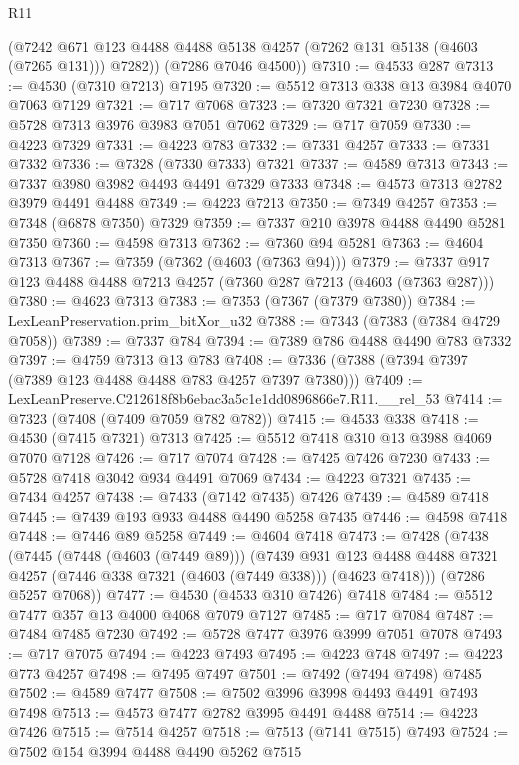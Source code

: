 \begin{lexlean}{R11}
\begin{coremodule}
        (@7242 @671 @123 @4488 @4488 @5138 @4257 (@7262 @131 @5138 (@4603 (@7265 @131))) @7282))
      (@7286 @7046 @4500))
@7310 := @4533 @287
@7313 := @4530 (@7310 @7213) @7195
@7320 := @5512 @7313 @338 @13 @3984 @4070 @7063 @7129
@7321 := @717 @7068
@7323 := @7320 @7321 @7230
@7328 := @5728 @7313 @3976 @3983 @7051 @7062
@7329 := @717 @7059
@7330 := @4223 @7329
@7331 := @4223 @783
@7332 := @7331 @4257
@7333 := @7331 @7332
@7336 := @7328 (@7330 @7333) @7321
@7337 := @4589 @7313
@7343 := @7337 @3980 @3982 @4493 @4491 @7329 @7333
@7348 := @4573 @7313 @2782 @3979 @4491 @4488
@7349 := @4223 @7213
@7350 := @7349 @4257
@7353 := @7348 (@6878 @7350) @7329
@7359 := @7337 @210 @3978 @4488 @4490 @5281 @7350
@7360 := @4598 @7313
@7362 := @7360 @94 @5281
@7363 := @4604 @7313
@7367 := @7359 (@7362 (@4603 (@7363 @94)))
@7379 := @7337 @917 @123 @4488 @4488 @7213 @4257 (@7360 @287 @7213 (@4603 (@7363 @287)))
@7380 := @4623 @7313
@7383 := @7353 (@7367 (@7379 @7380))
@7384 := LexLeanPreservation.prim_bitXor_u32
@7388 := @7343 (@7383 (@7384 @4729 @7058))
@7389 := @7337 @784
@7394 := @7389 @786 @4488 @4490 @783 @7332
@7397 := @4759 @7313 @13 @783
@7408 := @7336 (@7388 (@7394 @7397 (@7389 @123 @4488 @4488 @783 @4257 @7397 @7380)))
@7409 := LexLeanPreserve.C212618f8b6ebac3a5c1e1dd0896866e7.R11.__rel_53
@7414 := @7323 (@7408 (@7409 @7059 @782 @782))
@7415 := @4533 @338
@7418 := @4530 (@7415 @7321) @7313
@7425 := @5512 @7418 @310 @13 @3988 @4069 @7070 @7128
@7426 := @717 @7074
@7428 := @7425 @7426 @7230
@7433 := @5728 @7418 @3042 @934 @4491 @7069
@7434 := @4223 @7321
@7435 := @7434 @4257
@7438 := @7433 (@7142 @7435) @7426
@7439 := @4589 @7418
@7445 := @7439 @193 @933 @4488 @4490 @5258 @7435
@7446 := @4598 @7418
@7448 := @7446 @89 @5258
@7449 := @4604 @7418
@7473 := @7428
    (@7438
      (@7445
        (@7448 (@4603 (@7449 @89)))
        (@7439
          @931
          @123
          @4488
          @4488
          @7321
          @4257
          (@7446 @338 @7321 (@4603 (@7449 @338)))
          (@4623 @7418)))
      (@7286 @5257 @7068))
@7477 := @4530 (@4533 @310 @7426) @7418
@7484 := @5512 @7477 @357 @13 @4000 @4068 @7079 @7127
@7485 := @717 @7084
@7487 := @7484 @7485 @7230
@7492 := @5728 @7477 @3976 @3999 @7051 @7078
@7493 := @717 @7075
@7494 := @4223 @7493
@7495 := @4223 @748
@7497 := @4223 @773 @4257
@7498 := @7495 @7497
@7501 := @7492 (@7494 @7498) @7485
@7502 := @4589 @7477
@7508 := @7502 @3996 @3998 @4493 @4491 @7493 @7498
@7513 := @4573 @7477 @2782 @3995 @4491 @4488
@7514 := @4223 @7426
@7515 := @7514 @4257
@7518 := @7513 (@7141 @7515) @7493
@7524 := @7502 @154 @3994 @4488 @4490 @5262 @7515

\end{coremodule}
\end{lexlean}
